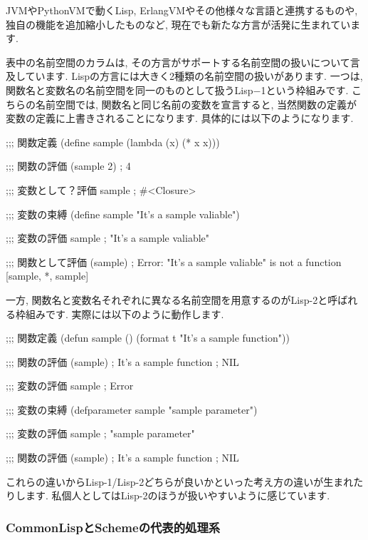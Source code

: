 \documentclass[mingoth,a4paper]{jsarticle}
\begin{document}
JVMやPythonVMで動くLisp, ErlangVMやその他様々な言語と連携するものや, 独自の機能を追加縮小したものなど, 現在でも新たな方言が活発に生まれています. 

表中の名前空間のカラムは, その方言がサポートする名前空間の扱いについて言及しています. Lispの方言には大きく2種類の名前空間の扱いがあります. 一つは, 関数名と変数名の名前空間を同一のものとして扱うLisp−1という枠組みです. こちらの名前空間では, 関数名と同じ名前の変数を宣言すると, 当然関数の定義が変数の定義に上書きされることになります. 具体的には以下のようになります. 

\begin{commandline}
;;; 関数定義
(define sample
	(lambda (x) (* x x)))

;;; 関数の評価
(sample 2)         ; 4

;;; 変数として？評価
sample             ; #<Closure>

;;; 変数の束縛
(define sample "It's a sample valiable")

;;; 変数の評価
sample             ; "It's a sample valiable"

;;; 関数として評価
(sample)           ; Error: "It's a sample valiable" is not a function [sample, *, sample]
\end{commandline}

一方, 関数名と変数名それぞれに異なる名前空間を用意するのがLisp-2と呼ばれる枠組みです. 実際には以下のように動作します. 

\begin{commandline}
;;; 関数定義 
(defun sample ()
	(format t "It's a sample function"))

;;; 関数の評価
(sample) ; It's a sample function
	     ; NIL

;;; 変数の評価
sample   ; Error

;;; 変数の束縛
(defparameter sample "sample parameter")

;;; 変数の評価
sample   ; "sample parameter"

;;; 関数の評価
(sample) ; It's a sample function
	     ; NIL
\end{commandline}

これらの違いからLisp-1/Lisp-2どちらが良いかといった考え方の違いが生まれたりします. 
私個人としてはLisp-2のほうが扱いやすいように感じています. 


\subsubsection{CommonLispとSchemeの代表的処理系}
\end{document}
